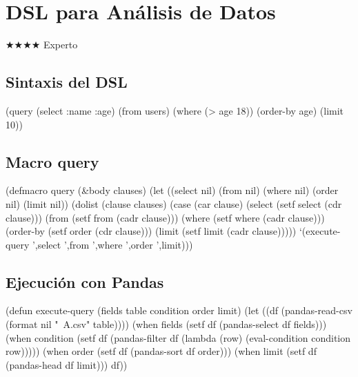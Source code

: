 \chapter{DSL para Análisis de Datos}
\label{chap:dsl-data-analysis}
{\huge$\bigstar$}{\huge$\bigstar$}{\huge$\bigstar$}{\huge$\bigstar$} Experto

\section{Sintaxis del DSL}
\begin{lispcode}
(query (select :name :age) (from users) (where (> age 18)) (order-by age) (limit 10))
\end{lispcode}

\section{Macro query}
\begin{lispcode}
(defmacro query (&body clauses)
  (let ((select nil) (from nil) (where nil) (order nil) (limit nil))
    (dolist (clause clauses)
      (case (car clause)
        (select (setf select (cdr clause)))
        (from (setf from (cadr clause)))
        (where (setf where (cadr clause)))
        (order-by (setf order (cdr clause)))
        (limit (setf limit (cadr clause)))))
    `(execute-query ',select ',from ',where ',order ',limit)))
\end{lispcode}

\section{Ejecución con Pandas}
\begin{lispcode}
(defun execute-query (fields table condition order limit)
  (let ((df (pandas-read-csv (format nil "~A.csv" table))))
    (when fields (setf df (pandas-select df fields)))
    (when condition (setf df (pandas-filter df (lambda (row)
                      (eval-condition condition row)))))
    (when order (setf df (pandas-sort df order)))
    (when limit (setf df (pandas-head df limit)))
    df))
\end{lispcode}

